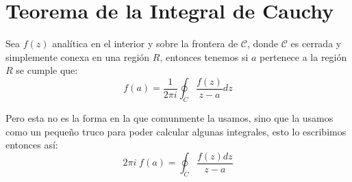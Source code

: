 \documentclass[12pt, fleqn]{report}                             %
\begin{document}
        \section{Teorema de la Integral de Cauchy}

            Sea $f(z)$ analítica en el interior y sobre la frontera de $\mathcal{C}$, donde
            $\mathcal{C}$ es cerrada y simplemente conexa en una región $R$, entonces
            tenemos si $a$ pertenece a la región $R$ se cumple que:
            \begin{equation*}
                f(a) = \dfrac{1}{2 \pi i} \oint_C \dfrac{f(z)}{z-a} dz
            \end{equation*}

            Pero esta no es la forma en la que comunmente la usamos, sino que la usamos
            como un pequeño truco para poder calcular algunas integrales,
            esto lo escribimos entonces así:
            \begin{equation*}
                2 \pi i \; f(a) = \oint_C \dfrac{f(z) dz}{z-a}
            \end{equation*}






\end{document}
